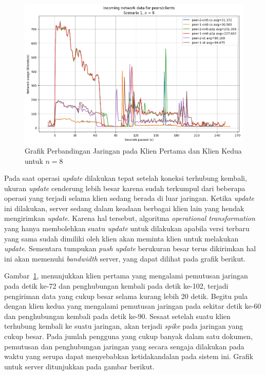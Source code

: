 \begin{figure}
 \centering
 \includegraphics[width=13cm]{./assets/skripsi/benchmark-vis_cell_2_output_23}
 \caption{Grafik Perbandingan Jaringan pada Klien Pertama dan Klien Kedua untuk $n = 8$}
 \label{fig:2-23}
\end{figure}

Pada saat operasi \textit{update} dilakukan tepat setelah koneksi terhubung kembali, ukuran \textit{update} cenderung lebih besar karena sudah terkumpul dari beberapa operasi yang terjadi selama klien sedang berada di luar jaringan. Ketika \textit{update} ini dilakukan, server sedang dalam keadaan berbagai klien lain yang hendak mengirimkan \textit{update}. Karena hal tersebut, algoritma \textit{operational transformation} yang hanya membolehkan suatu \textit{update} untuk dilakukan apabila versi terbaru yang sama sudah dimiliki oleh klien akan meminta klien untuk melakukan \textit{update}. Sementara tumpukan \textit{push update} berukuran besar terus dikirimkan hal ini akan memenuhi \textit{bandwidth} server, yang dapat dilihat pada grafik berikut.

Gambar~\ref{fig:2-23}, menunjukkan klien pertama yang mengalami pemutusan jaringan pada detik ke-72 dan penghubungan kembali pada detik ke-102, terjadi pengiriman data yang cukup besar selama kurang lebih 20 detik. Begitu pula dengan klien kedua yang mengalami pemutusan jaringan pada sekitar detik ke-60 dan penghubungan kembali pada detik ke-90. Sesaat setelah suatu klien terhubung kembali ke suatu jaringan, akan terjadi \textit{spike} pada jaringan yang cukup besar. Pada jumlah pengguna yang cukup banyak dalam satu dokumen, pemutusan dan penghubungan jaringan yang secara sengaja dilakukan pada waktu yang serupa dapat menyebabkan ketidakandalan pada sistem ini. Grafik untuk server ditunjukkan pada gambar berikut.

